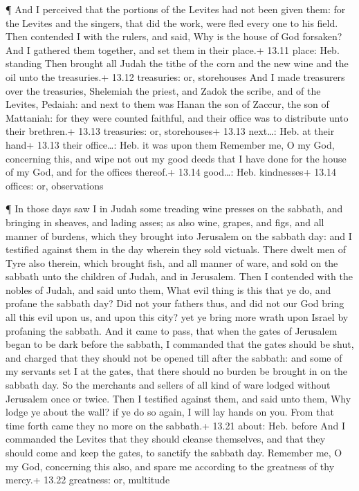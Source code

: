  ¶ And I perceived that the portions of the Levites had not
been given them: for the Levites and the singers, that did the work,
were fled every one to his field.  Then contended I with
the rulers, and said, Why is the house of God forsaken? And I gathered
them together, and set them in their place.+ 13.11 place: Heb. standing
 Then brought all Judah the tithe of the corn and the new
wine and the oil unto the treasuries.+ 13.12 treasuries: or, storehouses
 And I made treasurers over the treasuries, Shelemiah the
priest, and Zadok the scribe, and of the Levites, Pedaiah: and next to
them was Hanan the son of Zaccur, the son of Mattaniah: for they were
counted faithful, and their office was to distribute unto their
brethren.+ 13.13 treasuries: or, storehouses+ 13.13 next\ldots: Heb. at
their hand+ 13.13 their office\ldots: Heb. it was upon them
 Remember me, O my God, concerning this, and wipe not out
my good deeds that I have done for the house of my God, and for the
offices thereof.+ 13.14 good\ldots: Heb. kindnesses+ 13.14 offices: or,
observations

 ¶ In those days saw I in Judah some treading wine presses
on the sabbath, and bringing in sheaves, and lading asses; as also wine,
grapes, and figs, and all manner of burdens, which they brought into
Jerusalem on the sabbath day: and I testified against them in the day
wherein they sold victuals.  There dwelt men of Tyre also
therein, which brought fish, and all manner of ware, and sold on the
sabbath unto the children of Judah, and in Jerusalem.  Then
I contended with the nobles of Judah, and said unto them, What evil
thing is this that ye do, and profane the sabbath day?  Did
not your fathers thus, and did not our God bring all this evil upon us,
and upon this city? yet ye bring more wrath upon Israel by profaning the
sabbath.  And it came to pass, that when the gates of
Jerusalem began to be dark before the sabbath, I commanded that the
gates should be shut, and charged that they should not be opened till
after the sabbath: and some of my servants set I at the gates, that
there should no burden be brought in on the sabbath day. 
So the merchants and sellers of all kind of ware lodged without
Jerusalem once or twice.  Then I testified against them,
and said unto them, Why lodge ye about the wall? if ye do so again, I
will lay hands on you. From that time forth came they no more on the
sabbath.+ 13.21 about: Heb. before  And I commanded the
Levites that they should cleanse themselves, and that they should come
and keep the gates, to sanctify the sabbath day. Remember me, O my God,
concerning this also, and spare me according to the greatness of thy
mercy.+ 13.22 greatness: or, multitude

